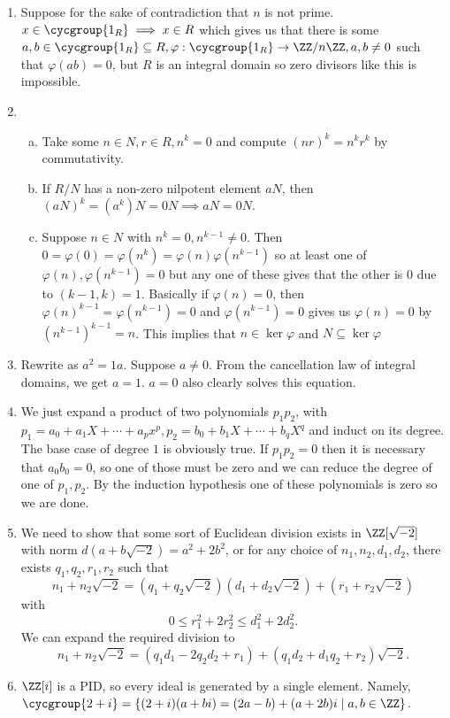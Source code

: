 \documentclass{article}
\begin{document}
\begin{enumerate}

\item
Suppose for the sake of contradiction that $n$ is not prime.
$x \in \cycgroup{1_R} \implies x \in R$ which gives us that there is
some $a, b \in \cycgroup{1_R} \subseteq R, \varphi : \cycgroup{1_R} \to
\ZZ / n \ZZ, a, b \neq 0$ such that $\varphi(ab) = 0$, but $R$ is an
integral domain so zero divisors like this is impossible.

\item
\begin{enumerate}[(a)]
\item
Take some $n \in N, r \in R, n^k = 0$ and compute $(nr)^k = n^k r^k$ by
commutativity.

\item
If $R / N$ has a non-zero nilpotent element $aN$, then $(aN)^k = (a^k)N
= 0N \implies aN = 0N$.

\item
Suppose $n \in N$ with $n^k = 0, n^{k - 1} \neq 0$. Then $0 = \varphi(0)
= \varphi(n^k) = \varphi(n) \varphi(n^{k - 1})$ so at least one of
$\varphi(n), \varphi(n^{k - 1}) = 0$ but any one of these gives that the
other is $0$ due to $(k - 1, k) = 1$. Basically if $\varphi(n) = 0$,
then $\varphi(n)^{k - 1} = \varphi(n^{k - 1}) = 0$ and $\varphi(n^{k -
1}) = 0$ gives us $\varphi(n) = 0$ by $\left(n^{k - 1}\right)^{k - 1} =
n$. This implies that $n \in \ker \varphi$ and $N \subseteq \ker
\varphi$
\end{enumerate}

\item
Rewrite as $a^2 = 1a$. Suppose $a \neq 0$. From the cancellation law of
integral domains, we get $a = 1$. $a = 0$ also clearly solves this
equation.

\item
We just expand a product of two polynomials $p_1 p_2$, with $p_1 = a_0 +
a_1 X + \cdots + a_p x^p, p_2 = b_0 + b_1 X + \cdots + b_q X^q$ and
induct on its degree. The base case of degree $1$ is obviously true. If
$p_1 p_2 = 0$ then it is necessary that $a_0 b_0 = 0$, so one of those
must be zero and we can reduce the degree of one of $p_1, p_2$. By the
induction hypothesis one of these polynomials is zero so we are done.

\item
We need to show that some sort of Euclidean division exists in
$\ZZ[\sqrt{-2}]$ with norm $d(a + b \sqrt{-2}) = a^2 + 2b^2$, or for any
choice of $n_1, n_2, d_1, d_2$, there exists $q_1, q_2, r_1, r_2$ such
that
\[ n_1 + n_2 \sqrt{-2} = (q_1 + q_2 \sqrt{-2})(d_1 + d_2 \sqrt{-2}) +
(r_1 + r_2 \sqrt{-2}) \]
with 
\[ 0 \leq r_1^2 + 2r_2^2 \leq d_1^2 + 2d_2^2. \]
We can expand the required division to
\[ n_1 + n_2 \sqrt{-2} = (q_1 d_1 - 2q_2 d_2 + r_1) + (q_1 d_2 + d_1 q_2
+ r_2)\sqrt{-2}. \]

\item $\ZZ[i]$ is a PID, so every ideal is generated by a single
element. Namely, $\cycgroup{2 + i} = \lbrace (2 + i)(a + bi) = (2a - b)
+ (a + 2b)i \mid a, b \in \ZZ
\rbrace$.

\end{enumerate}
\end{document}
